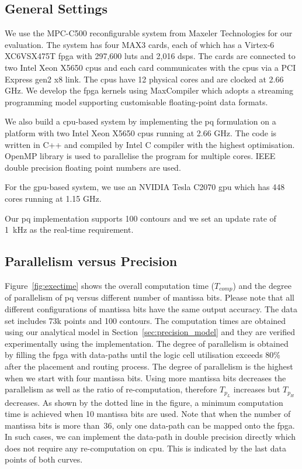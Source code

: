 \subsection{General Settings}
We use the MPC-C500 reconfigurable system from Maxeler Technologies for our evaluation.
The system has four MAX3 cards, each of which has a Virtex-6 XC6VSX475T \gls{fpga} with 297,600 \glspl{lut} and 2,016 \glspl{dsp}.
The cards are connected to two Intel Xeon X5650 \gls{cpu}s and each card communicates with the \gls{cpu}s via a PCI Express gen2 x8 link. 
The \gls{cpu}s have 12 physical cores and are clocked at 2.66 GHz.
We develop the \gls{fpga} kernels using MaxCompiler which adopts a streaming programming model supporting customisable floating-point data formats.

We also build a \gls{cpu}-based system by implementing the \gls{pq} formulation on a platform with two Intel Xeon X5650 \gls{cpu}s running at 2.66 GHz.
The code is written in C++ and compiled by Intel C compiler with the highest optimisation.
OpenMP library is used to parallelise the program for multiple cores.
IEEE double precision floating point numbers are used.

For the \gls{gpu}-based system, we use an NVIDIA Tesla C2070 \gls{gpu} which has 448 cores running at 1.15 GHz.

Our \gls{pq} implementation supports 100 contours and we set an update rate of 1~kHz as the real-time requirement.

\subsection{Parallelism versus Precision}
\label{sec:precision_parallelism}

Figure~\ref{fig:exectime} shows the overall computation time ($T_{comp}$)
and the degree of parallelism of \gls{pq} versus different number of mantissa bits.
Please note that all different configurations of mantissa bits have the same output accuracy.
The data set includes 73k points and 100 contours.
The computation times are obtained using our analytical model in Section~\ref{sec:precision_model} and they are verified experimentally using the implementation.
The degree of parallelism is obtained by filling the \gls{fpga} with data-paths until the logic cell utilisation exceeds 80\% after the placement and routing process.
The degree of parallelism is the highest when we start with four mantissa bits.
Using more mantissa bits decreases the parallelism as well as the ratio of re-computation, therefore $T_{p_L}$ increases but $T_{p_H}$ decreases.
As shown by the dotted line in the figure, a minimum computation time is achieved when 10 mantissa bits are used.
Note that when the number of mantissa bits is more than~36, only one data-path can be mapped onto the \gls{fpga}.
In such cases, we can implement the data-path in double precision directly which does not require any re-computation on \gls{cpu}.
This is indicated by the last data points of both curves.

